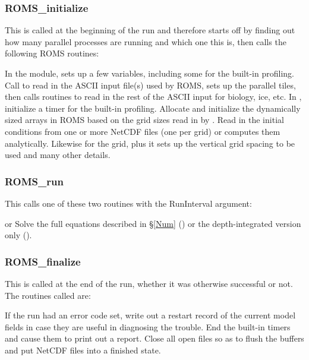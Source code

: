 \subsubsection{ROMS\_initialize}
This is called at the beginning of the run and therefore starts off
by finding out how many parallel processes are running and which one
this is, then calls the following ROMS routines:
\begin{klist}
   In the  module,
    sets up a few variables, including some for the built-in profiling.
   Call  to read in the ASCII input
    file(s) used by ROMS, sets up the parallel tiles, then calls
    routines to read in the rest of the ASCII input for biology, ice,
    etc.
   In , initialize a timer for
    the built-in profiling.
   Allocate and initialize the dynamically sized
    arrays in ROMS based on the grid sizes read in by .
   Read in the initial conditions from one or more NetCDF
    files (one per grid) or computes them analytically. Likewise
    for the grid, plus it sets up the vertical grid spacing to be
    used and many other details.
\end{klist}

\subsubsection{ROMS\_run}
This calls one of these two routines with the RunInterval argument:
\begin{klist}
   or  Solve the full
  equations described in \S\ref{Num} () or the depth-integrated
  version only ().
\end{klist}

\subsubsection{ROMS\_finalize}
This is called at the end of the run, whether it was otherwise
successful or not. The routines called are:
\begin{klist}
   If the run had an error code set, write out a
  restart record of the current model fields in case they are useful in
  diagnosing the trouble.
   End the built-in timers and cause them to print
  out a report.
   Close all open files so as to flush the buffers
  and put NetCDF files into a finished state.
\end{klist}

